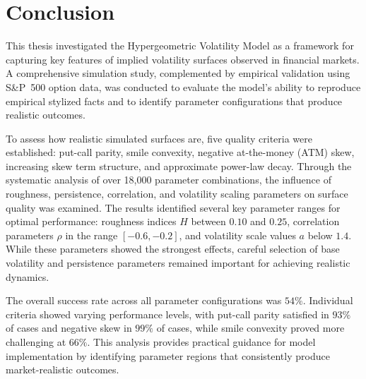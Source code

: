 \section{Conclusion} \label{sec:Conclusion}

This thesis investigated the Hypergeometric Volatility Model as a framework for capturing key features of implied volatility surfaces observed in financial markets. A comprehensive simulation study, complemented by empirical validation using S\&P~500 option data, was conducted to evaluate the model's ability to reproduce empirical stylized facts and to identify parameter configurations that produce realistic outcomes.

To assess how realistic simulated surfaces are, five quality criteria were established: put-call parity, smile convexity, negative at-the-money (ATM) skew, increasing skew term structure, and approximate power-law decay. Through the systematic analysis of over 18{,}000 parameter combinations, the influence of roughness, persistence, correlation, and volatility scaling parameters on surface quality was examined. The results identified several key parameter ranges for optimal performance: roughness indices $H$ between $0.10$ and $0.25$, correlation parameters $\rho$ in the range $[-0.6, -0.2]$, and volatility scale values $a$ below $1.4$. While these parameters showed the strongest effects, careful selection of base volatility and persistence parameters remained important for achieving realistic dynamics.

The overall success rate across all parameter configurations was $54\%$. Individual criteria showed varying performance levels, with put-call parity satisfied in $93\%$ of cases and negative skew in $99\%$ of cases, while smile convexity proved more challenging at $66\%$. This analysis provides practical guidance for model implementation by identifying parameter regions that consistently produce market-realistic outcomes.

